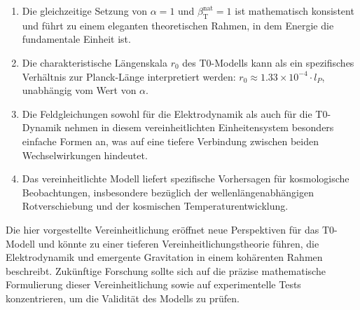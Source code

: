 \documentclass[12pt,a4paper]{article}
\newcommand{\betaT}{\beta_{\text{T}}}
\begin{document}
	\begin{enumerate}
		\item Die gleichzeitige Setzung von \(\alpha = 1\) und \(\betaT^{\text{nat}} = 1\) ist mathematisch konsistent und führt zu einem eleganten theoretischen Rahmen, in dem Energie die fundamentale Einheit ist.
		\item Die charakteristische Längenskala \(r_0\) des T0-Modells kann als ein spezifisches Verhältnis zur Planck-Länge interpretiert werden: \(r_0 \approx 1.33 \times 10^{-4} \cdot l_P\), unabhängig vom Wert von \(\alpha\).
		\item Die Feldgleichungen sowohl für die Elektrodynamik als auch für die T0-Dynamik nehmen in diesem vereinheitlichten Einheitensystem besonders einfache Formen an, was auf eine tiefere Verbindung zwischen beiden Wechselwirkungen hindeutet.
		\item Das vereinheitlichte Modell liefert spezifische Vorhersagen für kosmologische Beobachtungen, insbesondere bezüglich der wellenlängenabhängigen Rotverschiebung und der kosmischen Temperaturentwicklung.
	\end{enumerate}
	
	Die hier vorgestellte Vereinheitlichung eröffnet neue Perspektiven für das T0-Modell und könnte zu einer tieferen Vereinheitlichungstheorie führen, die Elektrodynamik und emergente Gravitation in einem kohärenten Rahmen beschreibt. Zukünftige Forschung sollte sich auf die präzise mathematische Formulierung dieser Vereinheitlichung sowie auf experimentelle Tests konzentrieren, um die Validität des Modells zu prüfen.
	
\end{document}
